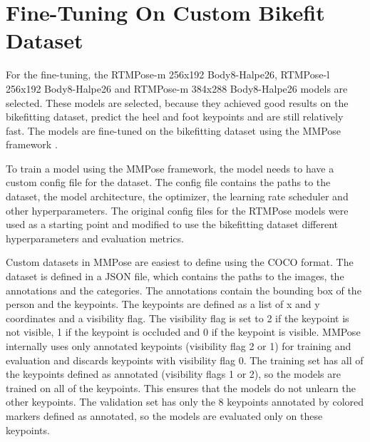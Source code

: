 \section{Fine-Tuning On Custom Bikefit Dataset}
\label{fine_tuning}
For the fine-tuning, the RTMPose-m 256x192 Body8-Halpe26, RTMPose-l 256x192 Body8-Halpe26 and RTMPose-m 384x288 Body8-Halpe26 models are selected. These models are selected, because they achieved good results on the bikefitting dataset, predict the heel and foot keypoints and are still relatively fast. The models are fine-tuned on the bikefitting dataset using the MMPose framework \cite{mmpose2020}.

To train a model using the MMPose framework, the model needs to have a custom config file for the dataset. The config file contains the paths to the dataset, the model architecture, the optimizer, the learning rate scheduler and other hyperparameters. The original config files for the RTMPose models were used as a starting point and modified to use the bikefitting dataset different hyperparameters and evaluation metrics.

Custom datasets in MMPose are easiest to define using the COCO format. The dataset is defined in a JSON file, which contains the paths to the images, the annotations and the categories. The annotations contain the bounding box of the person and the keypoints. The keypoints are defined as a list of x and y coordinates and a visibility flag. The visibility flag is set to 2 if the keypoint is not visible, 1 if the keypoint is occluded and 0 if the keypoint is visible. MMPose internally uses only annotated keypoints (visibility flag 2 or 1) for training and evaluation and discards keypoints with visibility flag 0. The training set has all of the keypoints defined as annotated (visibility flags 1 or 2), so the models are trained on all of the keypoints. This ensures that the models do not unlearn the other keypoints. The validation set has only the 8 keypoints annotated by colored markers defined as annotated, so the models are evaluated only on these keypoints.

